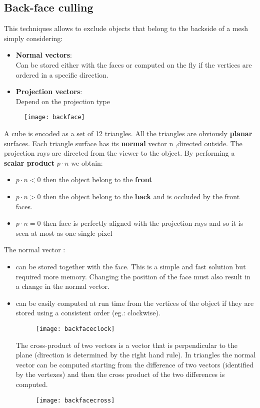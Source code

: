 \subsection{Back-face culling}
This techniques allows to exclude objects that belong to the backside of a mesh simply considering:
\begin{itemize}
\item \textbf{Normal vectors}:\\
Can be stored either with the faces or computed on the fly if the vertices are ordered in a specific direction.
\item \textbf{Projection vectors}:\\
Depend on the projection type
\end{itemize}
\begin{figure}[H]
  \centering
  \texttt{[image: backface]}
\end{figure}
A cube is encoded as a set of 12 triangles. All the triangles are obviously \textbf{planar} surfaces. Each triangle surface has its \textbf{normal} vector n ,directed outside. The projection rays are directed from the viewer to the object.
By performing a \textbf{scalar product} $p \cdot n$ we obtain:
\begin{itemize}
\item $p \cdot n < 0$ then the object belong to the \textbf{front}
\item $p \cdot n > 0$ then the object belong to the \textbf{back} and is occluded by
 the front faces.
\item $p \cdot n = 0$ then face is perfectly aligned with the projection rays and so it is seen at most as one single pixel
\end{itemize} 	
The normal vector :
\begin{itemize}
\item can be stored together with the face. This is a simple and fast solution but required more memory. Changing the position of the face must also result in a change in the normal vector.
\newpage
\item can be easily computed at run time from the vertices of the object if they are stored using a consistent order (eg.: clockwise). 
\begin{figure}[H]
  \centering
  \texttt{[image: backfaceclock]}
\end{figure}
The cross-product of two vectors is a vector that is perpendicular to the plane (direction is determined by the right hand rule). In triangles the normal vector can be computed starting from the difference of two vectors (identified by the vertexes) and then the cross product of the two differences is computed.
\begin{figure}[H]
  \centering
  \texttt{[image: backfacecross]}
\end{figure}
\end{itemize}
